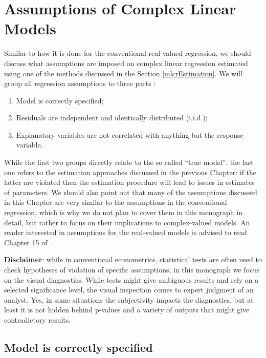 \documentclass[
]{book}
\providecommand{\tightlist}{%
  \setlength{\itemsep}{0pt}\setlength{\parskip}{0pt}}
\begin{document}
\hypertarget{assumptions}{%
\chapter{Assumptions of Complex Linear Models}\label{assumptions}}

Similar to how it is done for the conventional real valued regression, we should discuss what assumptions are imposed on complex linear regression estimated using one of the methods discussed in the Section \ref{mlcrEstimation}. We will group all regression assumptions to three parts \citep[similar to how it was done by][]{SvetunkovAdam}:

\begin{enumerate}
\def\labelenumi{\arabic{enumi}.}
\tightlist
\item
  Model is correctly specified;
\item
  Residuals are independent and identically distributed (i.i.d.);
\item
  Explanatory variables are not correlated with anything but the response variable.
\end{enumerate}

While the first two groups directly relate to the so called ``true model'', the last one refers to the estimation approaches discussed in the previous Chapter: if the latter are violated then the estimation procedure will lead to issues in estimates of parameters. We should also point out that many of the assumptions discussed in this Chapter are very similar to the assumptions in the conventional regression, which is why we do not plan to cover them in this monograph in detail, but rather to focus on their implications to complex-valued models. An reader interested in assumptions for the real-valued models is advised to read Chapter 15 of \citet{SvetunkovSBA}.

\textbf{Disclaimer}: while in conventional econometrics, statistical tests are often used to check hypotheses of violation of specific assumptions, in this monograph we focus on the visual diagnostics. While tests might give ambiguous results and rely on a selected significance level, the visual inspection comes to expert judgment of an analyst. Yes, in some situations the subjectivity impacts the diagnostics, but at least it is not hidden behind p-values and a variety of outputs that might give contradictory results.

\hypertarget{assumptionsSpecification}{%
\section{Model is correctly specified}\label{assumptionsSpecification}}
\end{document}
